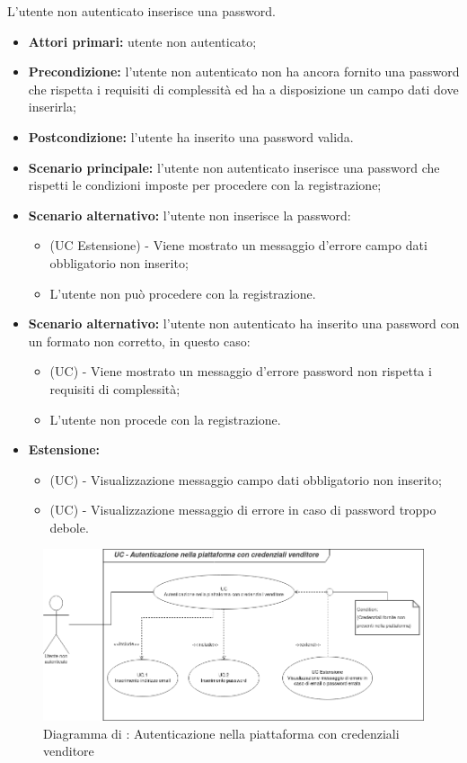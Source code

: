 L'utente non autenticato inserisce una password.
\begin{itemize}
	\item \textbf{Attori primari:} utente non autenticato;
	\item \textbf{Precondizione:} l'utente non autenticato non ha ancora fornito una password che rispetta i requisiti di complessità ed ha a disposizione un campo dati dove inserirla;
	\item \textbf{Postcondizione:} l'utente ha inserito una password valida.
	\item \textbf{Scenario principale:} l'utente non autenticato inserisce una password che rispetti le condizioni imposte per procedere con la registrazione;
	\item \textbf{Scenario alternativo:} l'utente non inserisce la password:
	\begin{itemize}
		\item (UC Estensione) - Viene mostrato un messaggio d'errore campo dati obbligatorio non inserito;
		\item L'utente non può procedere con la registrazione.
	\end{itemize}
	\item \textbf{Scenario alternativo:} l'utente non autenticato ha inserito una password con un formato non corretto, in questo caso:
	\begin{itemize}
		\item (UC) - Viene mostrato un messaggio d'errore password non rispetta i requisiti di complessità;
		\item L'utente non procede con la registrazione.
	\end{itemize}
	\item \textbf{Estensione:}
	\begin{itemize}
		\item (UC) - Visualizzazione messaggio campo dati obbligatorio non inserito;
		\item (UC) - Visualizzazione messaggio di errore in caso di password troppo debole.
	\end{itemize}
\end{itemize}

\begin{figure}[H]
    \centering
    \includegraphics[scale=0.6]{Immagini/DiagrammiUC/AccessoVenditore.png}
    \caption{Diagramma di \actualUC: Autenticazione nella piattaforma con credenziali venditore} 
    \label{fig:LoginVenditore}
\end{figure}

